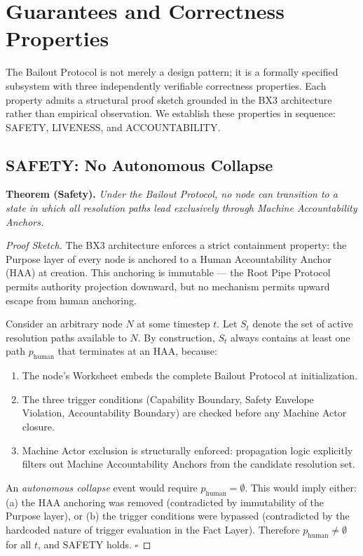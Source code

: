 \section{Guarantees and Correctness Properties}

The Bailout Protocol is not merely a design pattern; it is a formally specified subsystem with three independently verifiable correctness properties. Each property admits a structural proof sketch grounded in the BX3 architecture rather than empirical observation. We establish these properties in sequence: SAFETY, LIVENESS, and ACCOUNTABILITY.

\subsection{SAFETY: No Autonomous Collapse}

\textbf{Theorem (Safety).} \emph{Under the Bailout Protocol, no node can transition to a state in which all resolution paths lead exclusively through Machine Accountability Anchors.}

\begin{proof}[Proof Sketch]
The BX3 architecture enforces a strict containment property: the Purpose layer of every node is anchored to a Human Accountability Anchor (HAA) at creation. This anchoring is immutable — the Root Pipe Protocol permits authority projection downward, but no mechanism permits upward escape from human anchoring.

Consider an arbitrary node $N$ at some timestep $t$. Let $S_t$ denote the set of active resolution paths available to $N$. By construction, $S_t$ always contains at least one path $p_{\text{human}}$ that terminates at an HAA, because:
\begin{enumerate}
    \item The node's Worksheet embeds the complete Bailout Protocol at initialization.
    \item The three trigger conditions (Capability Boundary, Safety Envelope Violation, Accountability Boundary) are checked before any Machine Actor closure.
    \item Machine Actor exclusion is structurally enforced: propagation logic explicitly filters out Machine Accountability Anchors from the candidate resolution set.
\end{enumerate}

An \emph{autonomous collapse} event would require $p_{\text{human}} = \emptyset$. This would imply either: (a) the HAA anchoring was removed (contradicted by immutability of the Purpose layer), or (b) the trigger conditions were bypassed (contradicted by the hardcoded nature of trigger evaluation in the Fact Layer). Therefore $p_{\text{human}} \neq \emptyset$ for all $t$, and SAFETY holds. \hfill $\square$
\end{proof}

